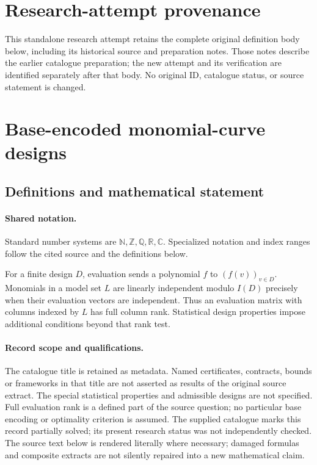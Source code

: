 \documentclass[11pt]{article}
\begin{document}
\section*{Research-attempt provenance}
This standalone research attempt retains the complete original definition body below,
including its historical source and preparation notes. Those notes describe the
earlier catalogue preparation; the new attempt and its verification are identified
separately after that body. No original ID, catalogue status, or source statement is changed.

\section{Base-encoded monomial-curve designs}\label{statement}

\subsection{Definitions and mathematical statement}

\paragraph{Shared notation.}Standard number systems are $\mathbb N,\mathbb Z,\mathbb Q,\mathbb R,\mathbb C$. Specialized notation and index ranges follow the cited source and the definitions below.


For a finite design $D$, evaluation sends a polynomial $f$ to $(f(v))_{v\in D}$. Monomials in a model set $L$ are linearly independent modulo $I(D)$ precisely when their evaluation vectors are independent. Thus an evaluation matrix with columns indexed by $L$ has full column rank. Statistical design properties impose additional conditions beyond that rank test.
\paragraph{Record scope and qualifications.}
The catalogue title is retained as metadata. Named certificates, contracts, bounds or frameworks in that title are not asserted as results of the original source extract.
The special statistical properties and admissible designs are not specified. Full evaluation rank is a defined part of the source question; no particular base encoding or optimality criterion is assumed. The supplied catalogue marks this record partially solved; its present research status was not independently checked.
The source text below is rendered literally where necessary; damaged formulas and composite extracts are not silently repaired into a new mathematical claim.
\end{document}
